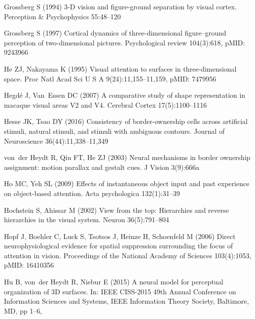 \begin{thebibliography}{90}
Grossberg S (1994) {3-D} vision and figure-ground separation by visual cortex.
  Perception \& Psychophysics 55:48--120

Grossberg S (1997) {C}ortical dynamics of three-dimensional figure--ground
  perception of two-dimensional pictures. Psychological review 104(3):618,
  pMID: 9243966

He ZJ, Nakayama K (1995) {V}isual attention to surfaces in three-dimensional
  space. Proc Natl Acad Sci U S A 9(24):11,155--11,159, pMID: 7479956

Hegd{\'e} J, Van~Essen DC (2007) {A} comparative study of shape representation
  in macaque visual areas {V}2 and {V}4. Cerebral Cortex 17(5):1100--1116

Hesse JK, Tsao DY (2016) Consistency of border-ownership cells across
  artificial stimuli, natural stimuli, and stimuli with ambiguous contours.
  Journal of Neuroscience 36(44):11,338--11,349

von~der Heydt R, Qiu FT, He ZJ (2003) {N}eural mechanisms in border ownership
  assignment: motion parallax and gestalt cues. J Vision 3(9):666a

Ho MC, Yeh SL (2009) {E}ffects of instantaneous object input and past
  experience on object-based attention. Acta psychologica 132(1):31--39

Hochstein S, Ahissar M (2002) {V}iew from the top: {H}ierarchies and reverse
  hierarchies in the visual system. Neuron 36(5):791--804

Hopf J, Boehler C, Luck S, Tsotsos J, Heinze H, Schoenfeld M (2006) {Direct
  neurophysiological evidence for spatial suppression surrounding the focus of
  attention in vision}. Proceedings of the National Academy of Sciences
  103(4):1053, pMID: 16410356

Hu B, von~der Heydt R, Niebur E (2015) {A} neural model for perceptual
  organization of 3{D} surfaces. In: IEEE CISS-2015 49th Annual Conference on
  Information Sciences and Systems, IEEE Information Theory Society, Baltimore,
  MD, pp 1--6, 


\end{thebibliography}
